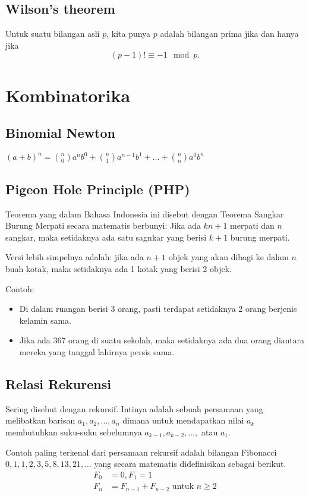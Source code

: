     \subsection{Wilson's theorem}
    Untuk suatu bilangan asli $p$, kita punya $p$ adalah bilangan prima jika dan hanya jika
    $$(p-1)! \equiv -1 \mod p.$$
    
\section{Kombinatorika}
    \subsection{Binomial Newton}
    $(a+b)^n = {n \choose 0} a^nb^0 + {n \choose 1} a^{n-1}b^1+ \dots +{n \choose n}a^0b^n$
    
    
    \subsection{Pigeon Hole Principle (PHP)}
    Teorema yang dalam Bahasa Indonesia ini disebut dengan Teorema Sangkar Burung Merpati secara matematis berbunyi:
    Jika ada $kn+1$ merpati dan $n$ sangkar, maka setidaknya ada satu sagnkar yang berisi $k+1$ burung merpati.
    
    Versi lebih simpelnya adalah: jika ada $n+1$ objek yang akan dibagi ke dalam $n$ buah kotak, maka setidaknya ada 1 kotak yang berisi 2 objek.
    
    Contoh: \begin{itemize}
        \item Di dalam ruangan berisi 3 orang, pasti terdapat setidaknya 2 orang berjenis kelamin sama.
        \item Jika ada 367 orang di suatu sekolah, maka setidaknya ada dua orang diantara mereka yang tanggal lahirnya persis sama.
    \end{itemize}
    
    \subsection{Relasi Rekurensi}
    Sering disebut dengan rekursif. Intinya adalah sebuah persamaan yang melibatkan barisan $a_1, a_2, \dots , a_n$ dimana untuk mendapatkan nilai $a_k$ membutuhkan suku-suku sebelumnya $a_{k-1}, a_{k-2}, \dots,$ atau $a_1$. 
    
    Contoh paling terkenal dari persamaan rekursif adalah bilangan Fibonacci $0,1,1,2,3,5,8,13,21,\dots$ yang secara matematis didefinisikan sebagai berikut.
    \begin{align*}
        F_0 &= 0, F_1 = 1\\
        F_n &= F_{n-1}+F_{n-2} \text{ untuk } n \ge 2
    \end{align*}
    
